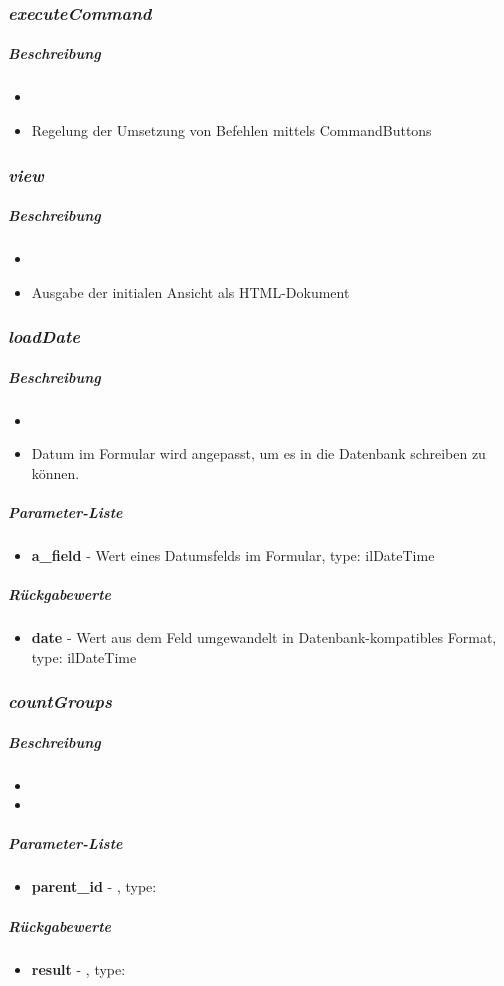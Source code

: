 \subsubsection*{\textit{executeCommand}}\label{executeCommandGGUI}
\subparagraph{Beschreibung}
\begin{itemize}
	\item[] \noindent{}
	\item[] Regelung der Umsetzung von Befehlen mittels CommandButtons
\end{itemize}

\subsubsection*{\textit{view}}\label{viewGGUI}
\subparagraph{Beschreibung}
\begin{itemize}
	\item[] \noindent{}
	\item[] Ausgabe der initialen Ansicht als HTML-Dokument
\end{itemize}

\subsubsection*{\textit{loadDate}}\label{loadDateGGUI}
\subparagraph{Beschreibung}
\begin{itemize}
	\item[] \noindent{}
	\item[] Datum im Formular wird angepasst, um es in die Datenbank schreiben zu können.
\end{itemize}
\subparagraph{Parameter-Liste}
\begin{itemize}
	\item[] \textbf{a\_field} - Wert eines Datumsfelds im Formular, type: ilDateTime
\end{itemize}
\subparagraph{Rückgabewerte}
\begin{itemize}
	\item[] \textbf{date} - Wert aus dem Feld umgewandelt in Datenbank-kompatibles Format, type: ilDateTime
\end{itemize}

\subsubsection*{\textit{countGroups}}\label{countGroupsGGUI}
\subparagraph{Beschreibung}
\begin{itemize}
	\item[] \noindent{}
	\item[] 
\end{itemize}
\subparagraph{Parameter-Liste}
\begin{itemize}
	\item[] \textbf{parent\_id} - , type: 
\end{itemize}
\subparagraph{Rückgabewerte}
\begin{itemize}
	\item[] \textbf{result} - , type: 
\end{itemize}

